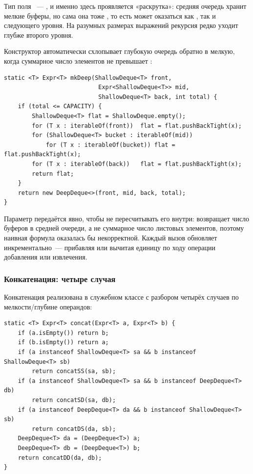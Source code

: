 Тип поля ~--- , и именно здесь
проявляется «раскрутка»: средняя очередь хранит мелкие буферы, но сама
она тоже , то есть может оказаться как
, так и  следующего уровня.
На разумных размерах выражений рекурсия редко уходит глубже второго
уровня.

Конструктор  автоматически схлопывает глубокую очередь обратно
в мелкую, когда суммарное число элементов не превышает :

\begin{longlisting}
\caption{Конструктор mkDeep с откатом в ShallowDeque}\label{lst:mkdeep}
\begin{verbatim}
static <T> Expr<T> mkDeep(ShallowDeque<T> front,
                           Expr<ShallowDeque<T>> mid,
                           ShallowDeque<T> back, int total) {
    if (total <= CAPACITY) {
        ShallowDeque<T> flat = ShallowDeque.empty();
        for (T x : iterableOf(front))  flat = flat.pushBackTight(x);
        for (ShallowDeque<T> bucket : iterableOf(mid))
            for (T x : iterableOf(bucket)) flat = flat.pushBackTight(x);
        for (T x : iterableOf(back))   flat = flat.pushBackTight(x);
        return flat;
    }
    return new DeepDeque<>(front, mid, back, total);
}
\end{verbatim}
\end{longlisting}

Параметр  передаётся явно, чтобы не пересчитывать его внутри:
 возвращает число буферов в средней очереди, а не суммарное
число листовых элементов, поэтому наивная формула
 оказалась бы некорректной.
Каждый вызов  обновляет  инкрементально~---
прибавляя или вычитая единицу по ходу операции добавления или извлечения.

\subsubsection{Конкатенация: четыре случая}

Конкатенация реализована в служебном классе  с разбором
четырёх случаев по мелкости/глубине операндов:

\begin{longlisting}
\caption{Разбор четырёх случаев конкатенации}\label{lst:concat-cases}
\begin{verbatim}
static <T> Expr<T> concat(Expr<T> a, Expr<T> b) {
    if (a.isEmpty()) return b;
    if (b.isEmpty()) return a;
    if (a instanceof ShallowDeque<T> sa && b instanceof ShallowDeque<T> sb)
        return concatSS(sa, sb);
    if (a instanceof ShallowDeque<T> sa && b instanceof DeepDeque<T> db)
        return concatSD(sa, db);
    if (a instanceof DeepDeque<T> da && b instanceof ShallowDeque<T> sb)
        return concatDS(da, sb);
    DeepDeque<T> da = (DeepDeque<T>) a;
    DeepDeque<T> db = (DeepDeque<T>) b;
    return concatDD(da, db);
}
\end{verbatim}
\end{longlisting}


